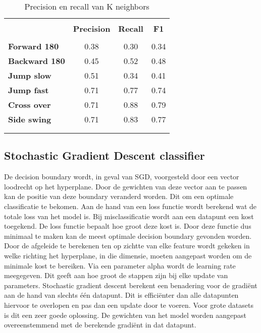 \begin{table}[!htpd]
  \centering
  \caption{Precision en recall van K neighbors}
  \label{tab:kneighbors}
\begin{tabular}{lccc}
 \hline \\
\textbf{}             & \textbf{Precision} & \textbf{Recall} & \textbf{F1} &  \\
\hline \\
\textbf{Forward 180}  & 0.38               & 0.30            & 0.34        &  \\
\textbf{Backward 180} & 0.45               & 0.52            & 0.48        &  \\
\textbf{Jump slow}    & 0.51               & 0.34            & 0.41        &  \\
\textbf{Jump fast}    & 0.71               & 0.77            & 0.74        &  \\
\textbf{Cross over}   & 0.71               & 0.88            & 0.79        &  \\
\textbf{Side swing}   & 0.71               & 0.83            & 0.77        & \\\\
\hline \\
\end{tabular}
\end{table}

\subsection{Stochastic Gradient Descent classifier}
De decision boundary wordt, in geval van SGD, voorgesteld door een vector loodrecht op het hyperplane. Door de gewichten van deze vector aan te passen kan de positie van deze boundary veranderd worden. Dit om een optimale classificatie te bekomen. 
Aan de hand van een loss functie wordt berekend wat de totale loss van het model is. Bij misclassificatie wordt aan een datapunt een kost toegekend. De loss functie bepaalt hoe groot deze kost is. Door deze functie dus minimaal te maken kan de meest optimale decision boundary gevonden worden. 
Door de afgeleide te berekenen ten op zichtte van elke feature wordt gekeken in welke richting het hyperplane, in die dimensie, moeten aangepast worden om de minimale kost te bereiken. 
Via een parameter alpha wordt de learning rate meegegeven. Dit geeft aan hoe groot de stappen zijn bij elke update van parameters.
Stochastic gradient descent berekent een benadering voor de gradiënt aan de hand van slechts één datapunt. Dit is efficiënter dan alle datapunten hiervoor te overlopen en pas dan een update door te voeren. Voor grote datasets is dit een zeer goede oplossing. 
De gewichten van het model worden aangepast overeenstemmend met de berekende gradiënt in dat datapunt. 

